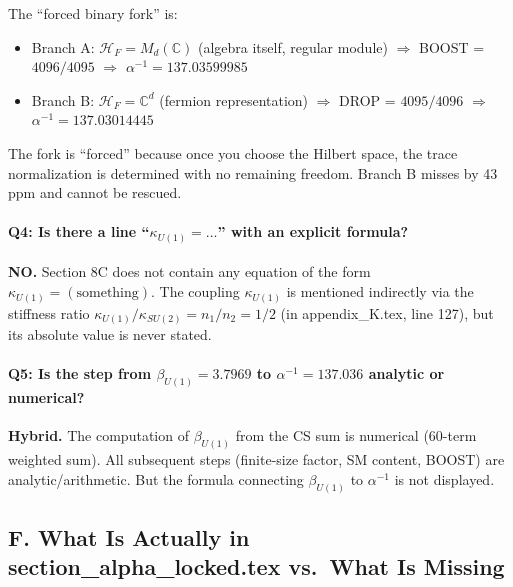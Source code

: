 The ``forced binary fork'' is:
\begin{itemize}
  \item Branch A: $\mathcal{H}_F = M_d(\mathbb{C})$ (algebra itself, regular module)
        $\Rightarrow$ BOOST = $4096/4095$ $\Rightarrow$ $\alpha^{-1} = 137.03599985$
  \item Branch B: $\mathcal{H}_F = \mathbb{C}^d$ (fermion representation)
        $\Rightarrow$ DROP = $4095/4096$ $\Rightarrow$ $\alpha^{-1} = 137.03014445$
\end{itemize}
The fork is ``forced'' because once you choose the Hilbert space, the trace
normalization is determined with no remaining freedom. Branch B misses by
43 ppm and cannot be rescued.

\paragraph{Q4: Is there a line ``$\kappa_{U(1)} = \ldots$'' with an explicit formula?}

\textbf{NO.} Section 8C does not contain any equation of the form
$\kappa_{U(1)} = (\text{something})$. The coupling $\kappa_{U(1)}$ is
mentioned indirectly via the stiffness ratio
$\kappa_{U(1)}/\kappa_{SU(2)} = n_1/n_2 = 1/2$
(in appendix\_K.tex, line 127), but its absolute value is never stated.

\paragraph{Q5: Is the step from $\beta_{U(1)} = 3.7969$ to
$\alpha^{-1} = 137.036$ analytic or numerical?}

\textbf{Hybrid.} The computation of $\beta_{U(1)}$ from the CS sum is
numerical (60-term weighted sum). All subsequent steps (finite-size factor,
SM content, BOOST) are analytic/arithmetic. But the formula connecting
$\beta_{U(1)}$ to $\alpha^{-1}$ is not displayed.

\subsection*{F. What Is Actually in section\_alpha\_locked.tex vs.\ What Is Missing}

